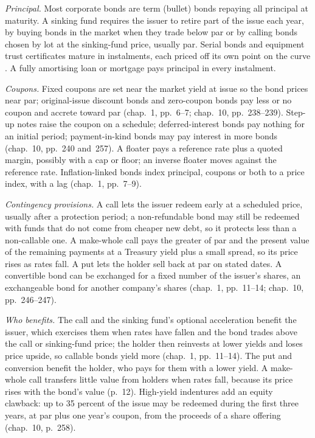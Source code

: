 \begin{qfdefinition}\label{def:bond-cash-flow-contingencies}
 \emph{Principal.} Most corporate bonds are term (bullet) bonds repaying all principal at maturity. A sinking fund requires the issuer to retire part of the issue each year, by buying bonds in the market when they trade below par or by calling bonds chosen by lot at the sinking-fund price, usually par. Serial bonds and equipment trust certificates mature in instalments, each priced off its own point on the curve \citep[chap.~1, pp.~5 and~13; chap.~10, p.~244]{s7-fabozzifixed}. A fully amortising loan or mortgage pays principal in every instalment.

\emph{Coupons.} Fixed coupons are set near the market yield at issue so the bond prices near par; original-issue discount bonds and zero-coupon bonds pay less or no coupon and accrete toward par (chap.~1, pp.~6--7; chap.~10, pp.~238--239). Step-up notes raise the coupon on a schedule; deferred-interest bonds pay nothing for an initial period; payment-in-kind bonds may pay interest in more bonds (chap.~10, pp.~240 and~257). A floater pays a reference rate plus a quoted margin, possibly with a cap or floor; an inverse floater moves against the reference rate. Inflation-linked bonds index principal, coupons or both to a price index, with a lag (chap.~1, pp.~7--9).

\emph{Contingency provisions.} A call lets the issuer redeem early at a scheduled price, usually after a protection period; a non-refundable bond may still be redeemed with funds that do not come from cheaper new debt, so it protects less than a non-callable one. A make-whole call pays the greater of par and the present value of the remaining payments at a Treasury yield plus a small spread, so its price rises as rates fall. A put lets the holder sell back at par on stated dates. A convertible bond can be exchanged for a fixed number of the issuer's shares, an exchangeable bond for another company's shares (chap.~1, pp.~11--14; chap.~10, pp.~246--247).

 \emph{Who benefits.} The call and the sinking fund's optional acceleration benefit the issuer, which exercises them when rates have fallen and the bond trades above the call or sinking-fund price; the holder then reinvests at lower yields and loses price upside, so callable bonds yield more (chap.~1, pp.~11--14). The put and conversion benefit the holder, who pays for them with a lower yield. A make-whole call transfers little value from holders when rates fall, because its price rises with the bond's value (p.~12). High-yield indentures add an equity clawback: up to 35 percent of the issue may be redeemed during the first three years, at par plus one year's coupon, from the proceeds of a share offering (chap.~10, p.~258).


\end{qfdefinition}
